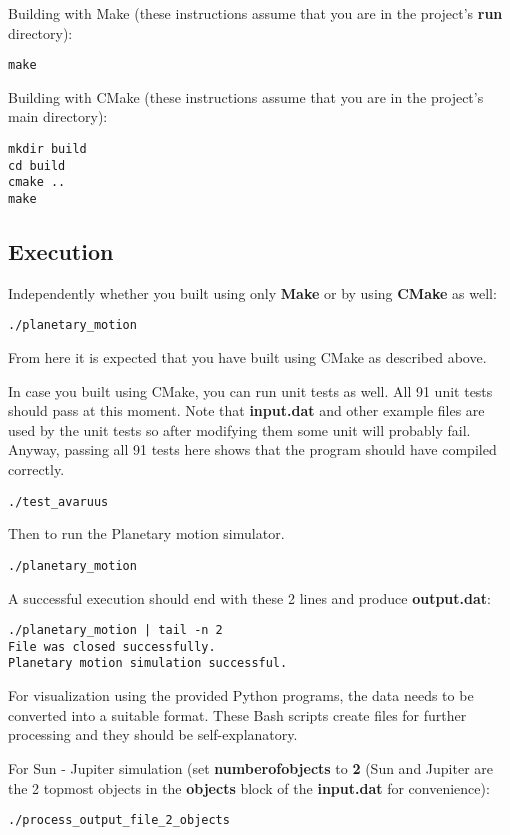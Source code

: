 \documentclass[12pt]{scrartcl}
\begin{document}
Building with Make (these instructions assume that you are in the project's \textbf{run} directory):
\begin{verbatim}
make
\end{verbatim}

Building with CMake (these instructions assume that you are in the project's main directory):
\begin{verbatim}
mkdir build
cd build
cmake ..
make
\end{verbatim}

\subsection*{Execution}
Independently whether you built using only \textbf{Make} or by using \textbf{CMake} as well:
\begin{verbatim}
./planetary_motion
\end{verbatim}

From here it is expected that you have built using CMake as described above.

In case you built using CMake, you can run unit tests as well. All 91 unit tests should pass at this moment. Note that \textbf{input.dat} and other example files are used by the unit tests so after modifying them some unit will probably fail. Anyway, passing all 91 tests here shows that the program should have compiled correctly.
\begin{verbatim}
./test_avaruus
\end{verbatim}

Then to run the Planetary motion simulator.
\begin{verbatim}
./planetary_motion
\end{verbatim}

A successful execution should end with these 2 lines and produce \textbf{output.dat}:

\begin{verbatim}
./planetary_motion | tail -n 2
File was closed successfully.
Planetary motion simulation successful.
\end{verbatim}

For visualization using the provided Python programs, the data needs to be converted into a suitable format. These Bash scripts create files for further processing and they should be self-explanatory.

For Sun - Jupiter simulation (set \textbf{number\textunderscore{}of\textunderscore{}objects} to \textbf{2} (Sun and Jupiter are the 2 topmost objects in the \textbf{objects} block of the \textbf{input.dat} for convenience):
\begin{verbatim}
./process_output_file_2_objects
\end{verbatim}
\end{document}
